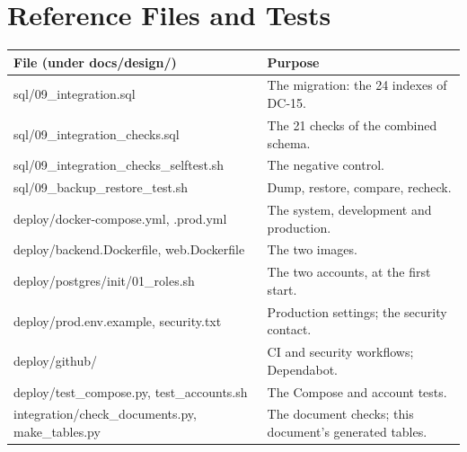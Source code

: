 \documentclass[11pt,a4paper]{article}
\newenvironment{dtable}[1]{\small\begin{longtable}{#1}}{\end{longtable}}
\begin{document}
\section{Reference Files and Tests}
\label{app:files}
\begin{dtable}{@{}>{\ttfamily\raggedright\arraybackslash}p{6.4cm}>{\raggedright\arraybackslash}p{8.8cm}@{}}
\toprule
\textnormal{\textbf{File (under docs/design/)}} & \textbf{Purpose} \\ \midrule \endhead
sql/09\_integration.sql & The migration: the 24 indexes of DC-15. \\
sql/09\_integration\_checks.sql & The 21 checks of the combined schema. \\
sql/09\_integration\_checks\_\allowbreak selftest.sh & The negative control. \\
sql/09\_backup\_restore\_test.sh & Dump, restore, compare, recheck. \\
deploy/docker-compose.yml, .prod.yml & The system, development and production. \\
deploy/backend.Dockerfile, web.Dockerfile & The two images. \\
deploy/postgres/init/01\_roles.sh & The two accounts, at the first start. \\
deploy/prod.env.example, security.txt & Production settings; the security contact. \\
deploy/github/ & CI and security workflows; Dependabot. \\
deploy/test\_compose.py, test\_accounts.sh & The Compose and account tests. \\
integration/check\_documents.py, make\_tables.py & The document checks; this document's generated tables. \\
\bottomrule
\end{dtable}
\end{document}
